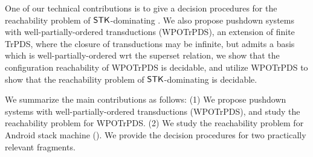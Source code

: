 One of our technical contributions is to give a decision procedures for the reachability problem of $\mathsf{STK}$-dominating {\AMASS}.
We also propose pushdown systems with well-partially-ordered transductions (WPOTrPDS), an extension of finite TrPDS, where the closure of transductions may be infinite, but admits a basis which is well-partially-ordered wrt the superset relation, we show that the configuration reachability of WPOTrPDS is decidable, and utilize WPOTrPDS to show that the reachability problem of $\mathsf{STK}$-dominating {\AMASS} is decidable.

We summarize the main contributions as follows: (1) We propose pushdown systems with well-partially-ordered transductions (WPOTrPDS), and study the reachability problem for WPOTrPDS.
%	
%	
%
    (2) We study the reachability problem for Android stack machine ({\AMASS}). 
	We provide the decision procedures for two practically relevant fragments. %
	

